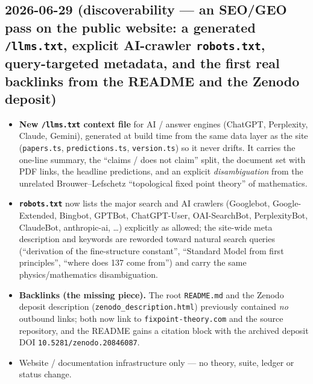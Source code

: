 \documentclass[11pt]{article}
\begin{document}
\subsection*{2026-06-29 (discoverability --- an SEO/GEO pass on the public website: a generated \texttt{/llms.txt}, explicit AI-crawler \texttt{robots.txt}, query-targeted metadata, and the first real backlinks from the README and the Zenodo deposit)}
\begin{itemize}
\item \textbf{New \texttt{/llms.txt} context file} for AI / answer engines (ChatGPT, Perplexity, Claude,
Gemini), generated at build time from the same data layer as the site (\texttt{papers.ts},
\texttt{predictions.ts}, \texttt{version.ts}) so it never drifts. It carries the one-line summary, the
``claims / does not claim'' split, the document set with PDF links, the headline predictions, and an
explicit \emph{disambiguation} from the unrelated Brouwer--Lefschetz ``topological fixed point theory'' of
mathematics.
\item \textbf{\texttt{robots.txt}} now lists the major search and AI crawlers (Googlebot, Google-Extended,
Bingbot, GPTBot, ChatGPT-User, OAI-SearchBot, PerplexityBot, ClaudeBot, anthropic-ai, \dots) explicitly as
allowed; the site-wide meta description and keywords are reworded toward natural search queries
(``derivation of the fine-structure constant'', ``Standard Model from first principles'', ``where does 137
come from'') and carry the same physics/mathematics disambiguation.
\item \textbf{Backlinks (the missing piece).} The root \texttt{README.md} and the Zenodo deposit description
(\texttt{zenodo\_description.html}) previously contained \emph{no} outbound links; both now link to
\texttt{fixpoint-theory.com} and the source repository, and the README gains a citation block with the
archived deposit DOI \texttt{10.5281/zenodo.20846087}.
\item Website / documentation infrastructure only --- no theory, suite, ledger or status change.
\end{itemize}
\end{document}
